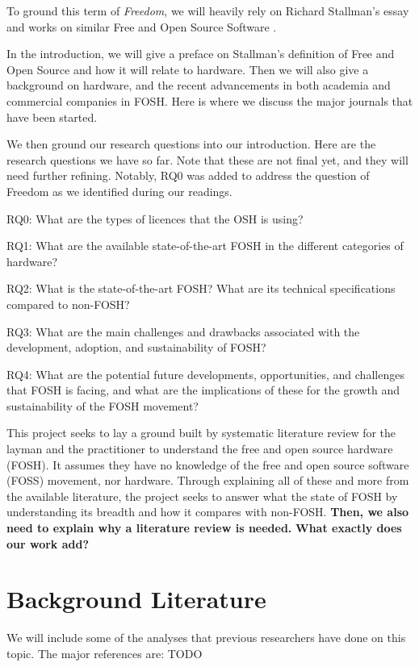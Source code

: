 \documentclass[acmtog]{acmart}
\begin{document}
To ground this term of \textit{Freedom}, 
we will heavily rely on Richard Stallman's essay and works on similar Free and Open Source Software \cite{b0_stallman}.

In the introduction, we will give a preface on Stallman's definition of Free and Open Source and how it will relate to hardware.
Then we will also give a background on hardware, and the recent advancements in both academia and commercial companies in FOSH.
Here is where we discuss the major journals that have been started. 

We then ground our research questions into our introduction.
Here are the research questions we have so far. 
Note that these are not final yet, and they will need further refining.
Notably, RQ0 was added to address the question of Freedom as we identified during our readings. 

RQ0: What are the types of licences that the OSH is using?

RQ1: What are the available state-of-the-art FOSH in the different categories of hardware?

RQ2: What is the state-of-the-art FOSH? What are its technical specifications compared to non-FOSH? 

RQ3: What are the main challenges and drawbacks associated with the development, adoption, and sustainability of FOSH?

RQ4: What are the potential future developments, opportunities, and challenges that FOSH is facing, and what are the implications of these for the growth and sustainability of the FOSH movement?

This project seeks to lay a ground built by systematic literature review for the layman and the practitioner to understand the free and open source hardware (FOSH).
It assumes they have no knowledge of the free and open source software (FOSS) movement, nor hardware.
Through explaining all of these and more from the available literature, the project seeks to answer what the state of FOSH by understanding its breadth and how it compares with non-FOSH.
\textbf{Then, we also need to explain why a literature review is needed.}
\textbf{What exactly does our work add?}

\section{Background Literature}
We will include some of the analyses that previous researchers have done on this topic. The major references are: TODO
\end{document}
